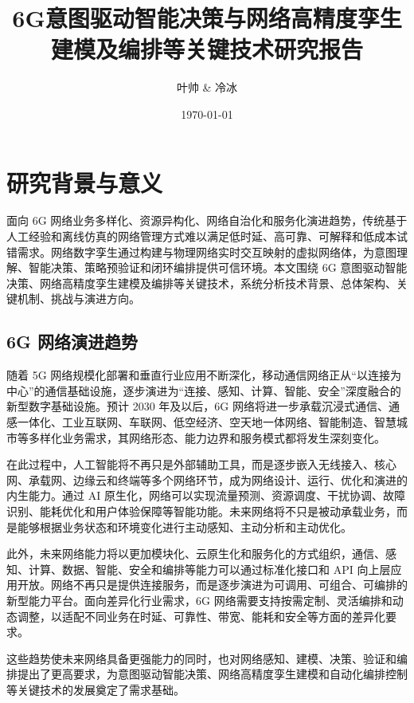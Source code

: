 \documentclass[lang=cn,12pt]{elegantbook}
\title{6G意图驱动智能决策与网络高精度孪生建模及编排等关键技术研究报告}
\author{叶帅 \& 冷冰}
\institute{中国移动紫金（江苏）创新研究院}
\date{\today}
\begin{document}
\maketitle
\frontmatter

\tableofcontents

\mainmatter

\chapter{研究背景与意义}

面向 6G 网络业务多样化、资源异构化、网络自治化和服务化演进趋势，传统基于人工经验和离线仿真的网络管理方式难以满足低时延、高可靠、可解释和低成本试错需求。网络数字孪生通过构建与物理网络实时交互映射的虚拟网络体，为意图理解、智能决策、策略预验证和闭环编排提供可信环境。本文围绕 6G 意图驱动智能决策、网络高精度孪生建模及编排等关键技术，系统分析技术背景、总体架构、关键机制、挑战与演进方向。

\section{6G 网络演进趋势}

随着 5G 网络规模化部署和垂直行业应用不断深化，移动通信网络正从“以连接为中心”的通信基础设施，逐步演进为“连接、感知、计算、智能、安全”深度融合的新型数字基础设施。预计 2030 年及以后，6G 网络将进一步承载沉浸式通信、通感一体化、工业互联网、车联网、低空经济、空天地一体网络、智能制造、智慧城市等多样化业务需求，其网络形态、能力边界和服务模式都将发生深刻变化。


在此过程中，人工智能将不再只是外部辅助工具，而是逐步嵌入无线接入、核心网、承载网、边缘云和终端等多个网络环节，成为网络设计、运行、优化和演进的内生能力。通过 AI 原生化，网络可以实现流量预测、资源调度、干扰协调、故障识别、能耗优化和用户体验保障等智能功能。未来网络将不只是被动承载业务，而是能够根据业务状态和环境变化进行主动感知、主动分析和主动优化。


此外，未来网络能力将以更加模块化、云原生化和服务化的方式组织，通信、感知、计算、数据、智能、安全和编排等能力可以通过标准化接口和 API 向上层应用开放。网络不再只是提供连接服务，而是逐步演进为可调用、可组合、可编排的新型能力平台。面向差异化行业需求，6G 网络需要支持按需定制、灵活编排和动态调整，以适配不同业务在时延、可靠性、带宽、能耗和安全等方面的差异化要求。


这些趋势使未来网络具备更强能力的同时，也对网络感知、建模、决策、验证和编排提出了更高要求，为意图驱动智能决策、网络高精度孪生建模和自动化编排控制等关键技术的发展奠定了需求基础。
\end{document}
